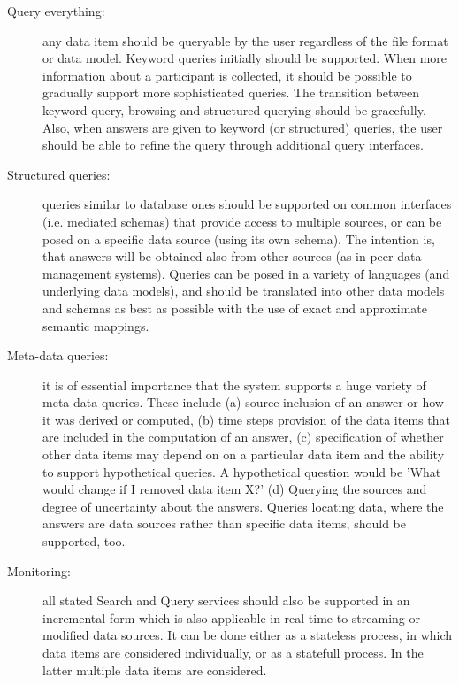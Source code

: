 \begin{description}
\item [Query everything:]  any data item should be queryable  by the user regardless of the file format or data model. 
Keyword queries initially should be supported. 
When more information about a participant is collected, it should be possible to gradually support more sophisticated queries. 
The transition between keyword query, browsing and structured querying should be gracefully. 
Also, when answers are given to keyword (or structured) queries, the user should be able to refine the query through additional query interfaces. 

\item [Structured queries:] queries similar to database ones should be supported on common interfaces (i.e. mediated schemas) that provide access to multiple sources, or can be posed on a specific data source (using its own schema). The intention is, that answers will be obtained also from other sources (as in peer-data management systems). Queries can be posed in a variety of languages (and underlying data models), and should be translated into other data models and schemas as best as possible with the use of exact and approximate semantic mappings.

\item [Meta-data queries:] it is of essential importance that the system supports a huge variety of meta-data queries. These include (a) source inclusion of an answer or how it was derived or computed, (b) time steps provision of the data items that are included in the computation of an answer, (c) specification of whether other data items may depend on on a particular data item and the ability to support hypothetical queries. A hypothetical question would be 'What would change if I removed data item X?' (d) Querying the sources and degree of uncertainty about the answers.
Queries locating data, where the answers are data sources rather than specific data items, should be supported, too. 

\item [Monitoring:] all stated Search and Query services should also be supported in an incremental form which is also applicable in real-time to streaming or modified data sources. It can be done either as a stateless process, in which data items are considered individually, or as a statefull process. In the latter multiple data items are considered.   
\end{description}

